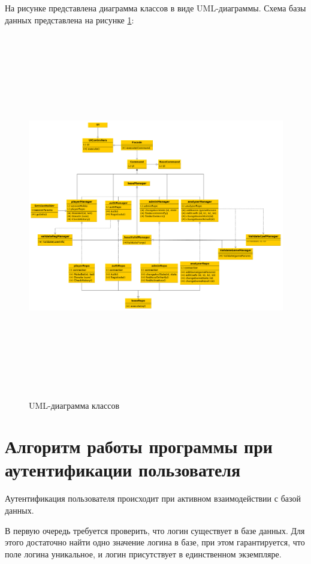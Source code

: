 На рисунке представлена диаграмма классов в виде UML-диаграммы.
Схема базы данных представлена на рисунке \ref{fig::uml}:
\FloatBarrier
\begin{figure}[hp]	
	\begin{center}
		\includegraphics[angle=90, width=\linewidth, height=16cm]{inc/uml.png}
	\end{center}
	\caption{UML-диаграмма классов}
	\label{fig::uml}
\end{figure}
\FloatBarrier

\section{Алгоритм работы программы при аутентификации пользователя}
Аутентификация пользователя происходит при активном взаимодействии с базой данных.

В первую очередь требуется проверить, что логин существует в базе данных. 
Для этого достаточно найти одно значение логина в базе, при этом гарантируется, что поле логина уникальное, и логин присутствует в единственном экземпляре.

